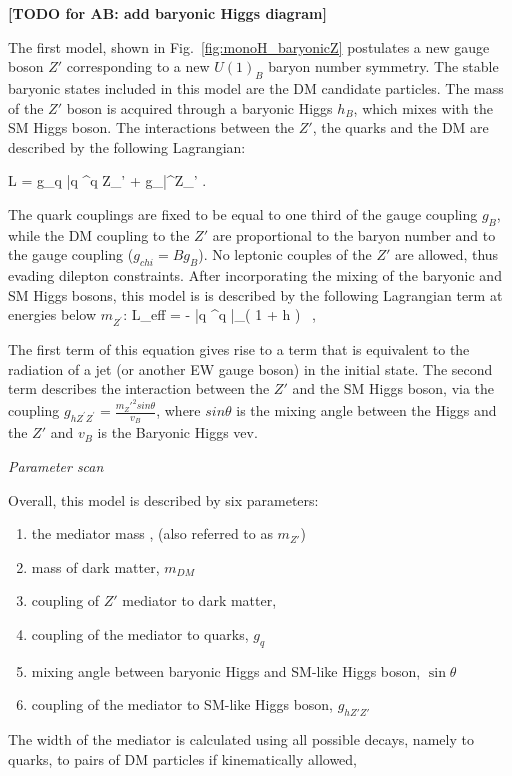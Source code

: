 \textbf{[TODO for AB: add baryonic Higgs diagram]}

The first model, shown in Fig.~\ref{fig:monoH_baryonicZ} 
postulates a new gauge boson $Z'$ corresponding to a new $U(1)_B$ baryon 
number symmetry. The stable baryonic states included in this model are the DM candidate particles.
The mass of the $Z'$ boson is acquired through a baryonic Higgs $h_B$, which mixes with the 
SM Higgs boson. The interactions between the $Z'$, the quarks and the DM are described by 
the following Lagrangian:   

\be \label{ZprimeDM}
	L =  g_q  \bar q \gamma^\mu q  Z_\mu' +
%
	 g_\chi  \bar\chi \gamma^\mu \chi Z_\mu' .
\ee

The quark couplings \gq are fixed to be equal to one third of the gauge coupling $g_B$, 
while the DM coupling to the $Z'$ are proportional to the baryon number and to the gauge coupling 
($g_{chi} = B g_B$). No leptonic couples of the $Z'$ are allowed, thus evading dilepton constraints. 
After incorporating the mixing of the baryonic and SM Higgs bosons, this model is 
is described by the following Lagrangian term at energies below $m_{Z^\prime}$: 
 \be \label{U1Beft}
 L_{\rm eff} = -  \bar{q} \gamma^\mu q \bar\chi \gamma_\mu \chi \Big( 1 +  h \Big) \, ,
 \ee

The first term of this equation gives rise to a term that is equivalent to the 
radiation of a jet (or another EW gauge boson) in the initial state. 
The second term describes the interaction between the $Z'$ and the SM Higgs boson,
via the coupling $g_{h Z^\prime Z^\prime} = \frac{m_Z'^2 sin\theta}{v_B}$, where
$sin\theta$ is the mixing angle between the Higgs and the $Z'$ and $v_B$ is the
Baryonic Higgs vev. 


\textit{Parameter scan} 

Overall, this model is described by six parameters:
\begin{enumerate}
	\item the mediator mass \mmed, (also referred to as $m_{Z'}$)
	\item mass of dark matter, $m_{DM}$
	\item coupling of $Z'$ mediator to dark matter, \gdm
	\item coupling of the mediator to quarks, $g_q$
	\item mixing angle between baryonic Higgs and SM-like Higgs boson, $\sin\theta$
	\item coupling of the mediator to SM-like Higgs boson, $g_{hZ'Z'}$
\end{enumerate}
The width of the mediator is calculated using all possible decays, 
namely to quarks, to pairs of DM particles if kinematically allowed, 


